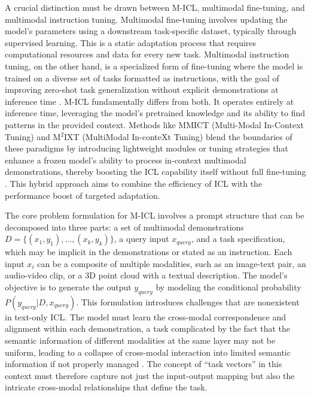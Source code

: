 \documentclass[11pt]{article}
\begin{document}
A crucial distinction must be drawn between M-ICL, multimodal fine-tuning, and multimodal instruction tuning. Multimodal fine-tuning involves updating the model's parameters using a downstream task-specific dataset, typically through supervised learning. This is a static adaptation process that requires computational resources and data for every new task. Multimodal instruction tuning, on the other hand, is a specialized form of fine-tuning where the model is trained on a diverse set of tasks formatted as instructions, with the goal of improving zero-shot task generalization without explicit demonstrations at inference time \cite{ref216}. M-ICL fundamentally differs from both. It operates entirely at inference time, leveraging the model's pretrained knowledge and its ability to find patterns in the provided context. Methods like MMICT (Multi-Modal In-Context Tuning) and M\(^2\)IXT (MultiModal In-conteXt Tuning) blend the boundaries of these paradigms by introducing lightweight modules or tuning strategies that enhance a frozen model's ability to process in-context multimodal demonstrations, thereby boosting the ICL capability itself without full fine-tuning \cite{ref217,ref218}. This hybrid approach aims to combine the efficiency of ICL with the performance boost of targeted adaptation.

The core problem formulation for M-ICL involves a prompt structure that can be decomposed into three parts: a set of multimodal demonstrations \(D = \{ (x_1, y_1), ..., (x_k, y_k) \}\), a query input \(x_{query}\), and a task specification, which may be implicit in the demonstrations or stated as an instruction. Each input \(x_i\) can be a composite of multiple modalities, such as an image-text pair, an audio-video clip, or a 3D point cloud with a textual description. The model's objective is to generate the output \(y_{query}\) by modeling the conditional probability \(P(y_{query} | D, x_{query})\). This formulation introduces challenges that are nonexistent in text-only ICL. The model must learn the cross-modal correspondence and alignment within each demonstration, a task complicated by the fact that the semantic information of different modalities at the same layer may not be uniform, leading to a collapse of cross-modal interaction into limited semantic information if not properly managed \cite{ref219}. The concept of ``task vectors'' in this context must therefore capture not just the input-output mapping but also the intricate cross-modal relationships that define the task.
\end{document}
